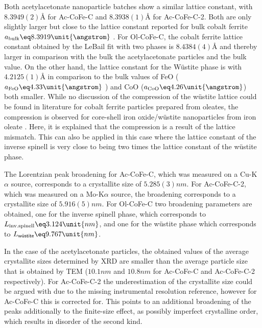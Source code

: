 \documentclass[\main/dresen_thesis.tex]{subfiles}
\begin{document}
    Both acetylacetonate nanoparticle batches show a similar lattice constant, with $8.3949(2) \unit{\angstrom}$ for Ac-CoFe-C and $8.3938(1) \unit{\angstrom}$ for Ac-CoFe-C-2.
    Both are only slightly larger but close to the lattice constant reported for bulk cobalt ferrite $a_\mathrm{bulk} \eq 8.3919 \unit{\angstrom}$ \cite{Stein_2018_Struct}.
    For Ol-CoFe-C, the cobalt ferrite lattice constant obtained by the LeBail fit with two phases is $8.4384(4) \unit{\angstrom}$ and thereby larger in comparison with the bulk the acetylacetonate particles and the bulk value.
    On the other hand, the lattice constant for the W\"ustite phase is with $4.2125(1) \unit{\angstrom}$ in comparison to the bulk values of FeO ($a_\mathrm{FeO} \eq 4.33 \unit{\angstrom}$ \cite{Hentschel_1970_Stoich}) and CoO ($a_\mathrm{CoO} \eq 4.26 \unit{\angstrom}$) both smaller.
    While no discussion of the compression of the w\"ustite lattice could be found in literature for cobalt ferrite particles prepared from oleates, the compression is observed for core-shell iron oxide/w\"ustite nanoparticles from iron oleate  \cite{Wetterskog_2013_Anoma}.
    Here, it is explained that the compression is a result of the lattice mismatch.
    This can also be applied in this case where the lattice constant of the inverse spinell is very close to being two times the lattice constant of the w\"ustite phase.

    The Lorentzian peak broadening for Ac-CoFe-C, which was measured on a Cu-K$\alpha$ source, corresponds to a crystallite size of $5.285(3) \unit{nm}$.
    For Ac-CoFe-C-2, which was measured on a Mo-K$\alpha$ source, the broadening corresponds to a crystallite size of $5.916(5) \unit{nm}$.
    For Ol-CoFe-C two broadening parameters are obtained, one for the inverse spinell phase, which corresponds to $L_{\mathrm{inv. spinell}} \eq 3.124 \unit{nm}$, and one for the w\"ustite phase which corresponds to $L_{\textsf{w\"ustite}} \eq 9.767 \unit{nm}$.

    In the case of the acetylacetonate particles, the obtained values of the average crystallite sizes determined by XRD are smaller than the average particle size that is obtained by TEM ($10.1 \unit{nm}$ and $10.8 \unit{nm}$ for Ac-CoFe-C and Ac-CoFe-C-2 respectively).
    For Ac-CoFe-C-2 the underestimation of the crystallite size could be argued with due to the missing instrumental resolution reference, however for Ac-CoFe-C this is corrected for.
    This points to an additional broadening of the peaks additionally to the finite-size effect, as possibly imperfect crystalline order, which results in disorder of the second kind.
\end{document}
